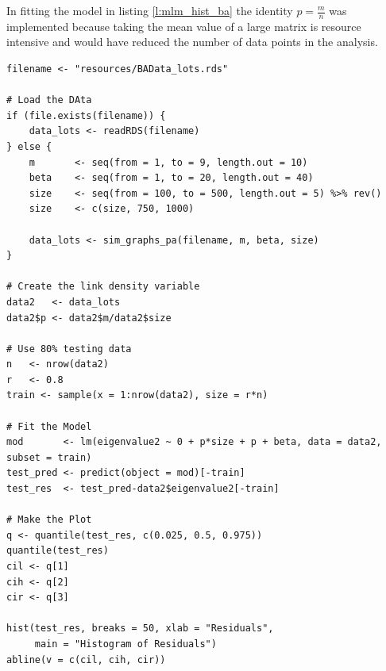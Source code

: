 \documentclass[11pt]{article}
\begin{document}
In fitting the model in listing \ref{l:mlm_hist_ba} the identity \(p = \frac{m}{n}\) was implemented because taking the mean value of a large matrix is resource intensive and would have reduced the number of data points in the analysis.


\begin{listing}[htbp]
\begin{verbatim}
filename <- "resources/BAData_lots.rds"

# Load the DAta
if (file.exists(filename)) {
    data_lots <- readRDS(filename)
} else {
    m       <- seq(from = 1, to = 9, length.out = 10)
    beta    <- seq(from = 1, to = 20, length.out = 40)
    size    <- seq(from = 100, to = 500, length.out = 5) %>% rev()
    size    <- c(size, 750, 1000)

    data_lots <- sim_graphs_pa(filename, m, beta, size)
}

# Create the link density variable
data2   <- data_lots
data2$p <- data2$m/data2$size

# Use 80% testing data
n   <- nrow(data2)
r   <- 0.8
train <- sample(x = 1:nrow(data2), size = r*n)

# Fit the Model
mod       <- lm(eigenvalue2 ~ 0 + p*size + p + beta, data = data2, subset = train)
test_pred <- predict(object = mod)[-train]
test_res  <- test_pred-data2$eigenvalue2[-train]

# Make the Plot
q <- quantile(test_res, c(0.025, 0.5, 0.975))
quantile(test_res)
cil <- q[1]
cih <- q[2]
cir <- q[3]

hist(test_res, breaks = 50, xlab = "Residuals",
     main = "Histogram of Residuals")
abline(v = c(cil, cih, cir))

\end{verbatim}
\caption{\label{l:mlm_hist_ba}l:mlm\textsubscript{hist}\textsubscript{ba}}
\end{listing}
\end{document}
